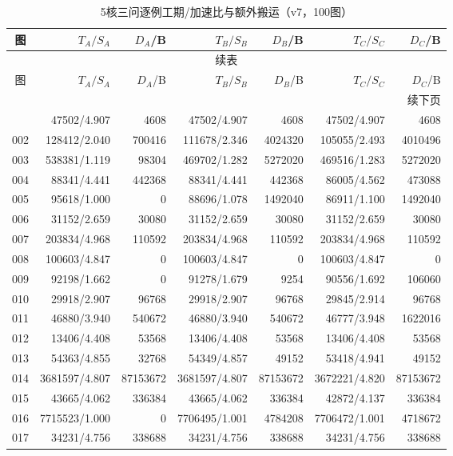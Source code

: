 \begin{longtable}{crrrrrr}
\caption{5核三问逐例工期/加速比与额外搬运（v7，100图）}\label{tab:detail-5}\\
\toprule
图 & $T_A/S_A$ & $D_A$/B & $T_B/S_B$ & $D_B$/B & $T_C/S_C$ & $D_C$/B \\
\midrule
\endfirsthead
\multicolumn{7}{c}{续表}\\
\toprule
图 & $T_A/S_A$ & $D_A$/B & $T_B/S_B$ & $D_B$/B & $T_C/S_C$ & $D_C$/B \\
\midrule
\endhead
\midrule\multicolumn{7}{r}{续下页}\\
\endfoot
\bottomrule
\endlastfoot
001 & 47502/4.907 & 4608 & 47502/4.907 & 4608 & 47502/4.907 & 4608 \\
002 & 128412/2.040 & 700416 & 111678/2.346 & 4024320 & 105055/2.493 & 4010496 \\
003 & 538381/1.119 & 98304 & 469702/1.282 & 5272020 & 469516/1.283 & 5272020 \\
004 & 88341/4.441 & 442368 & 88341/4.441 & 442368 & 86005/4.562 & 473088 \\
005 & 95618/1.000 & 0 & 88696/1.078 & 1492040 & 86911/1.100 & 1492040 \\
006 & 31152/2.659 & 30080 & 31152/2.659 & 30080 & 31152/2.659 & 30080 \\
007 & 203834/4.968 & 110592 & 203834/4.968 & 110592 & 203834/4.968 & 110592 \\
008 & 100603/4.847 & 0 & 100603/4.847 & 0 & 100603/4.847 & 0 \\
009 & 92198/1.662 & 0 & 91278/1.679 & 9254 & 90556/1.692 & 106060 \\
010 & 29918/2.907 & 96768 & 29918/2.907 & 96768 & 29845/2.914 & 96768 \\
011 & 46880/3.940 & 540672 & 46880/3.940 & 540672 & 46777/3.948 & 1622016 \\
012 & 13406/4.408 & 53568 & 13406/4.408 & 53568 & 13406/4.408 & 53568 \\
013 & 54363/4.855 & 32768 & 54349/4.857 & 49152 & 53418/4.941 & 49152 \\
014 & 3681597/4.807 & 87153672 & 3681597/4.807 & 87153672 & 3672221/4.820 & 87153672 \\
015 & 43665/4.062 & 336384 & 43665/4.062 & 336384 & 42872/4.137 & 336384 \\
016 & 7715523/1.000 & 0 & 7706495/1.001 & 4784208 & 7706472/1.001 & 4718672 \\
017 & 34231/4.756 & 338688 & 34231/4.756 & 338688 & 34231/4.756 & 338688 \\

\end{longtable}
